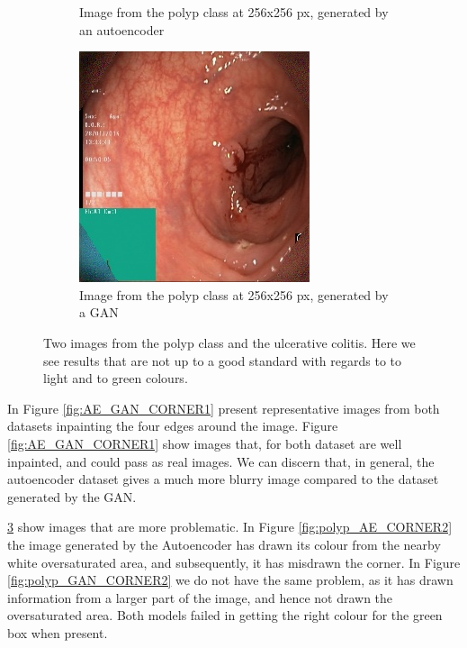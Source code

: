 \begin{figure}
\begin{subfigure}[t]{0.4\textwidth}
            \caption{Image from the polyp class at 256x256 px, generated by an autoencoder }   
            \label{fig:z_AE_CORNER2}
        \end{subfigure}
        \qquad%
        \begin{subfigure}[t]{0.4\textwidth}   
            \centering 
            \includegraphics[width=\textwidth]{experiments/figures/blackcorner/polypwithgreenGAN.jpg}
            \caption{Image from the polyp class at 256x256 px, generated by a GAN }   
            \label{fig:z_GAN_CORNER2}
        \end{subfigure}
        \caption{Two images from the polyp class and the ulcerative colitis. Here we see results that are not up to a good standard with regards to to light and to green colours.} 
        \label{fig:AE_GAN_CORNER2}
    \end{figure}
    
In Figure \ref{fig:AE_GAN_CORNER1} present representative images from both datasets inpainting the four edges around the image. Figure \ref{fig:AE_GAN_CORNER1} show images that, for both dataset are well inpainted, and could pass as real images.
We can discern that, in general, the autoencoder dataset gives a much more blurry image compared to the dataset generated by the GAN. 

\ref{fig:AE_GAN_CORNER2} show images that are more problematic. In Figure \ref{fig:polyp_AE_CORNER2} the image generated by the Autoencoder has drawn its colour from the nearby white oversaturated area, and subsequently, it has misdrawn the corner. In Figure \ref{fig:polyp_GAN_CORNER2} we do not have the same problem, as it has drawn information from a larger part of the image, and hence not drawn the oversaturated area.
Both models failed in getting the right colour for the green box when present.


